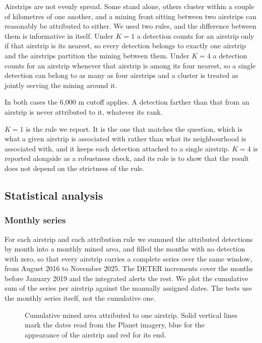 \documentclass[11pt]{article}
\begin{document}
Airstrips are not evenly spread. Some stand alone, others cluster within a couple of kilometres of one another, and a mining front sitting between two airstrips can reasonably be attributed to either. We used two rules, and the difference between them is informative in itself. Under $K = 1$ a detection counts for an airstrip only if that airstrip is its nearest, so every detection belongs to exactly one airstrip and the airstrips partition the mining between them. Under $K = 4$ a detection counts for an airstrip whenever that airstrip is among its four nearest, so a single detection can belong to as many as four airstrips and a cluster is treated as jointly serving the mining around it.

In both cases the 6{,}000 m cutoff applies. A detection farther than that from an airstrip is never attributed to it, whatever its rank.

$K = 1$ is the rule we report. It is the one that matches the question, which is what a given airstrip is associated with rather than what its neighbourhood is associated with, and it keeps each detection attached to a single airstrip. $K = 4$ is reported alongside as a robustness check, and its role is to show that the result does not depend on the strictness of the rule.

\subsection{Statistical analysis}

\subsubsection{Monthly series}

For each airstrip and each attribution rule we summed the attributed detections by month into a monthly mined area, and filled the months with no detection with zero, so that every airstrip carries a complete series over the same window, from August 2016 to November 2025. The DETER increments cover the months before January 2019 and the integrated alerts the rest. We plot the cumulative sum of the series per airstrip against the manually assigned dates. The tests use the monthly series itself, not the cumulative one.

\begin{figure}[htbp]
\centering
\caption{Cumulative mined area attributed to one airstrip. Solid vertical lines mark the dates read from the Planet imagery, blue for the appearance of the airstrip and red for its end.}
\label{fig:cumulative}
\end{figure}
\end{document}
